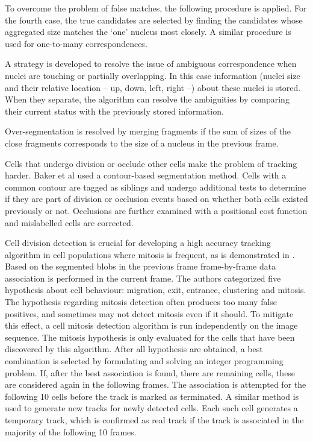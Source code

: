 \documentclass[12pt,a4paper,openany]{book}
\begin{document}
To overcome the problem of false matches, the following procedure is applied. For the fourth case, the true candidates are selected by finding the candidates whose aggregated size matches the `one' nucleus most closely. A similar procedure is used for one-to-many correspondences.

A strategy is developed to resolve the issue of ambiguous correspondence when nuclei are touching or partially overlapping. In this case information (nuclei size and their relative location -- up, down, left, right --) about these nuclei is stored. When they separate, the algorithm can resolve the ambiguities by comparing their current status with the previously stored information.

Over-segmentation is resolved by merging fragments if the sum of sizes of the close fragments corresponds to the size of a nucleus in the previous frame.

Cells that undergo division or occlude other cells make the problem of tracking harder. Baker et al \cite{baker13} used a contour-based segmentation method. Cells with a common contour are tagged as siblings and undergo additional tests to determine if they are part of division or occlusion events based on whether both cells existed previously or not. Occlusions are further examined with a positional cost function and mislabelled cells are corrected.

Cell division detection is crucial for developing a high accuracy tracking algorithm in cell populations where mitosis is frequent, as is demonstrated in \cite{huh13}. Based on the segmented blobs in the previous frame frame-by-frame data association is performed in the current frame. The authors categorized five hypothesis about cell behaviour: migration, exit, entrance, clustering and mitosis. The hypothesis regarding mitosis detection often produces too many false positives, and sometimes may not detect mitosis even if it should. To mitigate this effect, a cell mitosis detection algorithm is run independently on the image sequence. The mitosis hypothesis is only evaluated for the cells that have been discovered by this algorithm. After all hypothesis are obtained, a best combination is selected by formulating and solving an integer programming problem. If, after the best association is found, there are remaining cells, these are considered again in the following frames. The association is attempted for the following 10 cells before the track is marked as terminated. A similar method is used to generate new tracks for newly detected cells. Each such cell generates a temporary track, which is confirmed as real track if the track is associated in the majority of the following 10 frames.
\end{document}
